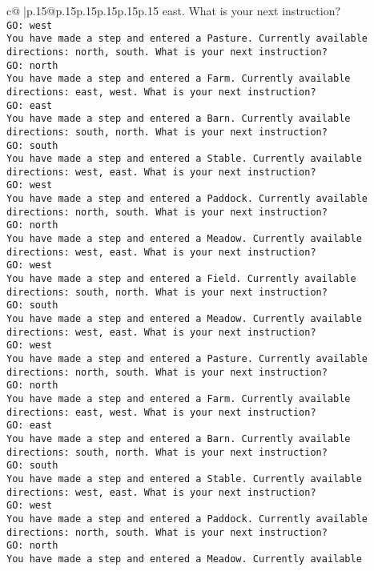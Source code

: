 \documentclass{article}
\begin{document}
{\begin{supertabular}{c@{$\;$}|p{.15\linewidth}@{}p{.15\linewidth}p{.15\linewidth}p{.15\linewidth}p{.15\linewidth}p{.15\linewidth}}
{{{east. What is your next instruction?\\ \tt GO: west\\ \tt You have made a step and entered a Pasture. Currently available directions: north, south. What is your next instruction?\\ \tt GO: north\\ \tt You have made a step and entered a Farm. Currently available directions: east, west. What is your next instruction?\\ \tt GO: east\\ \tt You have made a step and entered a Barn. Currently available directions: south, north. What is your next instruction?\\ \tt GO: south\\ \tt You have made a step and entered a Stable. Currently available directions: west, east. What is your next instruction?\\ \tt GO: west\\ \tt You have made a step and entered a Paddock. Currently available directions: north, south. What is your next instruction?\\ \tt GO: north\\ \tt You have made a step and entered a Meadow. Currently available directions: west, east. What is your next instruction?\\ \tt GO: west\\ \tt You have made a step and entered a Field. Currently available directions: south, north. What is your next instruction?\\ \tt GO: south\\ \tt You have made a step and entered a Meadow. Currently available directions: west, east. What is your next instruction?\\ \tt GO: west\\ \tt You have made a step and entered a Pasture. Currently available directions: north, south. What is your next instruction?\\ \tt GO: north\\ \tt You have made a step and entered a Farm. Currently available directions: east, west. What is your next instruction?\\ \tt GO: east\\ \tt You have made a step and entered a Barn. Currently available directions: south, north. What is your next instruction?\\ \tt GO: south\\ \tt You have made a step and entered a Stable. Currently available directions: west, east. What is your next instruction?\\ \tt GO: west\\ \tt You have made a step and entered a Paddock. Currently available directions: north, south. What is your next instruction?\\ \tt GO: north\\ \tt You have made a step and entered a Meadow. Currently available }}}
\end{supertabular}}
\end{document}
